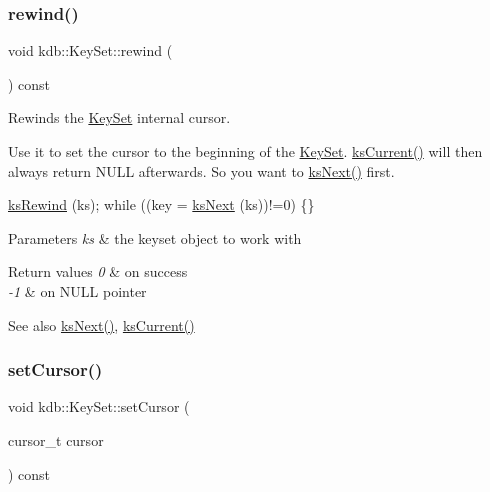 \subsubsection{\texorpdfstring{rewind()}{rewind()}}
{\footnotesize\ttfamily void kdb\+::\+Key\+Set\+::rewind (\begin{DoxyParamCaption}{ }\end{DoxyParamCaption}) const\hspace{0.3cm}{\ttfamily [inline]}}



Rewinds the \hyperlink{classkdb_1_1KeySet}{Key\+Set} internal cursor. 

Use it to set the cursor to the beginning of the \hyperlink{classkdb_1_1KeySet}{Key\+Set}. \hyperlink{group__keyset_ga4287b9416912c5f2ab9c195cb74fb094}{ks\+Current()} will then always return N\+U\+LL afterwards. So you want to \hyperlink{group__keyset_ga317321c9065b5a4b3e33fe1c399bcec9}{ks\+Next()} first.


\begin{DoxyCode}
\hyperlink{group__keyset_gabe793ff51f1728e3429c84a8a9086b70}{ksRewind} (ks);
\textcolor{keywordflow}{while} ((key = \hyperlink{group__keyset_ga317321c9065b5a4b3e33fe1c399bcec9}{ksNext} (ks))!=0) \{\}
\end{DoxyCode}



\begin{DoxyParams}{Parameters}
{\em ks} & the keyset object to work with \\
\hline
\end{DoxyParams}

\begin{DoxyRetVals}{Return values}
{\em 0} & on success \\
\hline
{\em -\/1} & on N\+U\+LL pointer \\
\hline
\end{DoxyRetVals}
\begin{DoxySeeAlso}{See also}
\hyperlink{group__keyset_ga317321c9065b5a4b3e33fe1c399bcec9}{ks\+Next()}, \hyperlink{group__keyset_ga4287b9416912c5f2ab9c195cb74fb094}{ks\+Current()} 
\end{DoxySeeAlso}
\mbox{\label{classkdb_1_1KeySet_a716d522e1f64e53d4f9706b5d71bb1b5}} 
\subsubsection{\texorpdfstring{set\+Cursor()}{setCursor()}}
{\footnotesize\ttfamily void kdb\+::\+Key\+Set\+::set\+Cursor (\begin{DoxyParamCaption}\item[{cursor\+\_\+t}]{cursor }\end{DoxyParamCaption}) const\hspace{0.3cm}{\ttfamily [inline]}}



